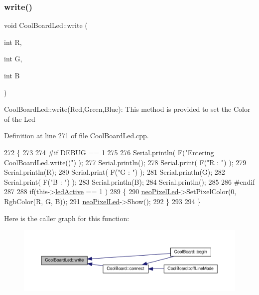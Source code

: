 \subsubsection{\texorpdfstring{write()}{write()}}
{\footnotesize\ttfamily void Cool\+Board\+Led\+::write (\begin{DoxyParamCaption}\item[{int}]{R,  }\item[{int}]{G,  }\item[{int}]{B }\end{DoxyParamCaption})}

Cool\+Board\+Led\+::write(\+Red,\+Green,\+Blue)\+: This method is provided to set the Color of the Led 

Definition at line 271 of file Cool\+Board\+Led.\+cpp.


\begin{DoxyCode}
272 \{
273 
274 \textcolor{preprocessor}{#if DEBUG == 1}
275 
276     Serial.println( F(\textcolor{stringliteral}{"Entering CoolBoardLed.write()"}) );
277     Serial.println();
278     Serial.print( F(\textcolor{stringliteral}{"R : "}) );
279     Serial.println(R);
280     Serial.print( F(\textcolor{stringliteral}{"G : "}) );
281     Serial.println(G);
282     Serial.print( F(\textcolor{stringliteral}{"B : "}) );
283     Serial.println(B);
284     Serial.println();   
285 
286 \textcolor{preprocessor}{#endif}
287 
288     \textcolor{keywordflow}{if}(this->\hyperlink{class_cool_board_led_aadd04d2ecf123247718d77f42fba7f08}{ledActive} == 1 )
289     \{
290         \hyperlink{class_cool_board_led_ac2c13fa462a010cd9242bf297c013923}{neoPixelLed}->SetPixelColor(0, RgbColor(R, G, B));
291         \hyperlink{class_cool_board_led_ac2c13fa462a010cd9242bf297c013923}{neoPixelLed}->Show();
292     \}
293 
294 \}
\end{DoxyCode}
Here is the caller graph for this function\+:\nopagebreak
\begin{figure}[H]
\begin{center}
\leavevmode
\includegraphics[width=350pt]{de/dc0/class_cool_board_led_a30fadd4cbec17ceea428bf7a32207e87_icgraph}
\end{center}
\end{figure}


